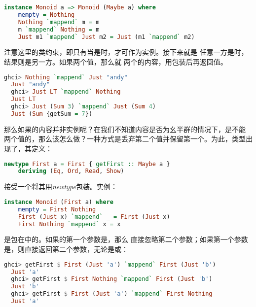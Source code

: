 \documentclass[./main.tex]{subfiles}
\begin{document}
\begin{lstlisting}[language=Haskell]
  instance Monoid a => Monoid (Maybe a) where
    mempty = Nothing
    Nothing `mappend` m = m
    m `mappend` Nothing = m
    Just m1 `mappend` Just m2 = Just (m1 `mappend` m2)
\end{lstlisting}

注意这里的类约束，即只有当是时，才可作为实例。接下来就是
任意一方是时，结果则是另一方。如果两个值，那么就
两个的内容，用包装后再返回值。

\begin{lstlisting}[language=Haskell]
  ghci> Nothing `mappend` Just "andy"
  Just "andy"
  ghci> Just LT `mappend` Nothing
  Just LT
  ghci> Just (Sum 3) `mappend` Just (Sum 4)
  Just (Sum {getSum = 7})
\end{lstlisting}

那么如果的内容并非实例呢？在我们不知道内容是否为幺半群的情况下，是不能
两个值的，那么该怎么做？一种方式是丢弃第二个值并保留第一个。为此，类型出现了，其定义：

\begin{lstlisting}[language=Haskell]
  newtype First a = First { getFirst :: Maybe a }
    deriving (Eq, Ord, Read, Show)
\end{lstlisting}

接受一个将其用\textit{newtype}包装。实例：

\begin{lstlisting}[language=Haskell]
  instance Monoid (First a) where
    mempty = First Nothing
    First (Just x) `mappend` _ = First (Just x)
    First Nothing `mappend` x = x
\end{lstlisting}

是包在中的。如果的第一个参数是，那么
直接忽略第二个参数；如果第一个参数是，则直接返回第二个参数，无论是或：

\begin{lstlisting}[language=Haskell]
  ghci> getFirst $ First (Just 'a') `mappend` First (Just 'b')
  Just 'a'
  ghci> getFirst $ First Nothing `mappend` First (Just 'b')
  Just 'b'
  ghci> getFirst $ First (Just 'a') `mappend` First Nothing
  Just 'a'
\end{lstlisting}
\end{document}
